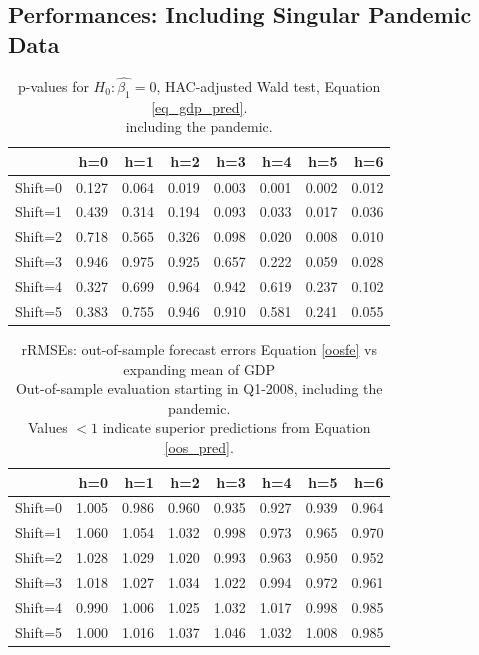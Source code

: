\documentclass[11pt,a4paper]{article}
\begin{document}
\newpage
\subsection{Performances: Including Singular Pandemic Data}



\begin{table}[ht]
\centering
\begin{tabular}{rrrrrrrr}
  \hline
 & h=0 & h=1 & h=2 & h=3 & h=4 & h=5 & h=6 \\ 
  \hline
Shift=0 & 0.127 & 0.064 & 0.019 & 0.003 & 0.001 & 0.002 & 0.012 \\ 
  Shift=1 & 0.439 & 0.314 & 0.194 & 0.093 & 0.033 & 0.017 & 0.036 \\ 
  Shift=2 & 0.718 & 0.565 & 0.326 & 0.098 & 0.020 & 0.008 & 0.010 \\ 
  Shift=3 & 0.946 & 0.975 & 0.925 & 0.657 & 0.222 & 0.059 & 0.028 \\ 
  Shift=4 & 0.327 & 0.699 & 0.964 & 0.942 & 0.619 & 0.237 & 0.102 \\ 
  Shift=5 & 0.383 & 0.755 & 0.946 & 0.910 & 0.581 & 0.241 & 0.055 \\ 
   \hline
\end{tabular}
\caption{p-values for $H_0: \hat{\beta_1} = 0$, HAC-adjusted Wald test, Equation \ref{eq_gdp_pred}.\\ including the pandemic.} 
\label{p_val1}
\end{table}%
\begin{table}[ht]
\centering
\begin{tabular}{rrrrrrrr}
  \hline
 & h=0 & h=1 & h=2 & h=3 & h=4 & h=5 & h=6 \\ 
  \hline
Shift=0 & 1.005 & 0.986 & 0.960 & 0.935 & 0.927 & 0.939 & 0.964 \\ 
  Shift=1 & 1.060 & 1.054 & 1.032 & 0.998 & 0.973 & 0.965 & 0.970 \\ 
  Shift=2 & 1.028 & 1.029 & 1.020 & 0.993 & 0.963 & 0.950 & 0.952 \\ 
  Shift=3 & 1.018 & 1.027 & 1.034 & 1.022 & 0.994 & 0.972 & 0.961 \\ 
  Shift=4 & 0.990 & 1.006 & 1.025 & 1.032 & 1.017 & 0.998 & 0.985 \\ 
  Shift=5 & 1.000 & 1.016 & 1.037 & 1.046 & 1.032 & 1.008 & 0.985 \\ 
   \hline
\end{tabular}
\caption{rRMSEs: out-of-sample forecast errors Equation \ref{oosfe} vs expanding mean of GDP\\Out-of-sample evaluation starting in Q1-2008, including the pandemic.\\Values $< 1$ indicate superior predictions from Equation \ref{oos_pred}.} 
\label{rRMSE_mSSA_comp_mean2}
\end{table}%
\end{document}
